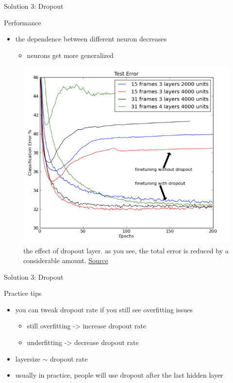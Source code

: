 \begin{frame}{Solution 3: Dropout}
	\begin{block}{Performance}
		\begin{itemize}
			\item the dependence between different neuron decreases
			\begin{itemize}
				\item neurons get more generalized
			\end{itemize}
		\end{itemize}
		
		\begin{figure}[H]
			\centering
			\includegraphics[height=0.4\textheight]{Figs/section_4/dropout_performance.png}
			\caption{the effect of dropout layer. as you see, the total error is reduced by a considerable amount. \href{https://towardsdatascience.com/understanding-and-implementing-dropout-in-tensorflow-and-keras-a8a3a02c1bfa}{Source}}
		\end{figure}
	\end{block}
\end{frame}
\begin{frame}{Solution 3: Dropout}
	\begin{block}{Practice tips}
		\begin{itemize}
			\item you can tweak dropout rate if you still see overfitting issues
			\begin{itemize}
				\item still overfitting -> increase dropout rate
				\item underfitting -> decrease dropout rate
			\end{itemize}
			\item layersize $\sim$ dropout rate
			\item usually in practice, people will use dropout after the last hidden layer
		\end{itemize}
	\end{block}
\end{frame}




